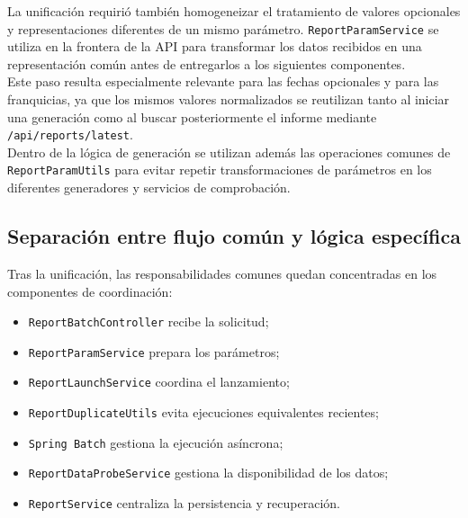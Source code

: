 \documentclass[11pt,a4paper,titlepage,oneside]{report}
\begin{document}
La unificación requirió también homogeneizar el tratamiento de valores
opcionales y representaciones diferentes de un mismo parámetro.
\texttt{ReportParamService} se utiliza en la frontera de la API para
transformar los datos recibidos en una representación común antes de
entregarlos a los siguientes componentes. \\

Este paso resulta especialmente relevante para las fechas opcionales y para
las franquicias, ya que los mismos valores normalizados se reutilizan tanto al
iniciar una generación como al buscar posteriormente el informe mediante
\texttt{/api/reports/latest}. \\

Dentro de la lógica de generación se utilizan además las operaciones comunes
de \texttt{ReportParamUtils} para evitar repetir transformaciones de
parámetros en los diferentes generadores y servicios de comprobación.

\subsection{Separación entre flujo común y lógica específica}

Tras la unificación, las responsabilidades comunes quedan concentradas en los
componentes de coordinación:

\begin{itemize}

  \item \texttt{ReportBatchController} recibe la solicitud;

  \item \texttt{ReportParamService} prepara los parámetros;

  \item \texttt{ReportLaunchService} coordina el lanzamiento;

  \item \texttt{ReportDuplicateUtils} evita ejecuciones equivalentes
  recientes;

  \item \texttt{Spring Batch} gestiona la ejecución asíncrona;

  \item \texttt{ReportDataProbeService} gestiona la disponibilidad de los datos;

  \item \texttt{ReportService} centraliza la persistencia y recuperación.

\end{itemize}
\end{document}
